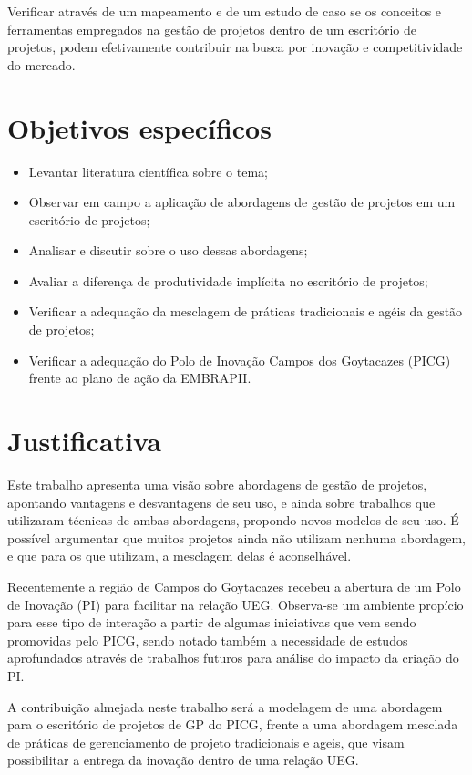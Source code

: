 Verificar através de um mapeamento e de um estudo de caso se os conceitos e ferramentas empregados na gestão de projetos dentro de um escritório de projetos, podem efetivamente contribuir na busca por inovação e competitividade do mercado.


\section{Objetivos específicos}

\begin{itemize}
  \item{Levantar literatura científica sobre o tema;}
  \item{Observar em campo a aplicação de abordagens de gestão de projetos em um escritório de projetos;}
  \item{Analisar e discutir sobre o uso dessas abordagens;}
  \item{Avaliar a diferença de produtividade implícita no escritório de projetos;}
  \item{Verificar a adequação da mesclagem de práticas tradicionais e agéis da gestão de projetos;}
  \item{Verificar a adequação do Polo de Inovação Campos dos Goytacazes (PICG) frente ao plano de ação da EMBRAPII.}
\end{itemize}

\section{Justificativa}

Este trabalho apresenta uma visão sobre abordagens de gestão de projetos, apontando vantagens e desvantagens de seu uso, e ainda sobre trabalhos que utilizaram técnicas de ambas abordagens, propondo novos modelos de seu uso. É possível argumentar que muitos projetos ainda não utilizam nenhuma abordagem, e que para os que utilizam, a mesclagem delas é aconselhável.

Recentemente a região de Campos do Goytacazes recebeu a abertura de um Polo de Inovação (PI) para facilitar na relação UEG. Observa-se um ambiente propício para esse tipo de interação a partir de algumas iniciativas que vem sendo promovidas pelo PICG, sendo notado também a necessidade de estudos aprofundados através de trabalhos futuros para análise do impacto da criação do PI.

A contribuição almejada neste trabalho será a modelagem de uma abordagem para o escritório de projetos de GP do PICG, frente a uma abordagem mesclada de práticas de gerenciamento de projeto tradicionais e ageis, que visam possibilitar a entrega da inovação dentro de uma relação UEG.


